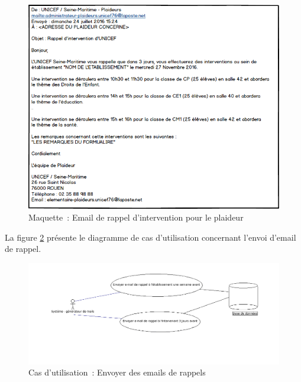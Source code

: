\begin{figure}[H]
	\centering
	\includegraphics[scale=0.65]{images/maquettes/fonctionnalite7MailDeRappelPourLePlaideur.png}
	\caption{Maquette~: Email de rappel d'intervention pour le plaideur}
	\label{courrielRappelPlaideur}
\end{figure}

La figure \ref{envoiRappel} présente le diagramme de cas d'utilisation concernant l'envoi d'email de rappel.
 
\begin{figure}[H]
	\centering
	\includegraphics[scale=0.4]{images/casDUtilisation/fonctionnalite7Rappels.png}
	 \caption{Cas d'utilisation~: Envoyer des emails de rappels}
	 \label{envoiRappel}
\end{figure}